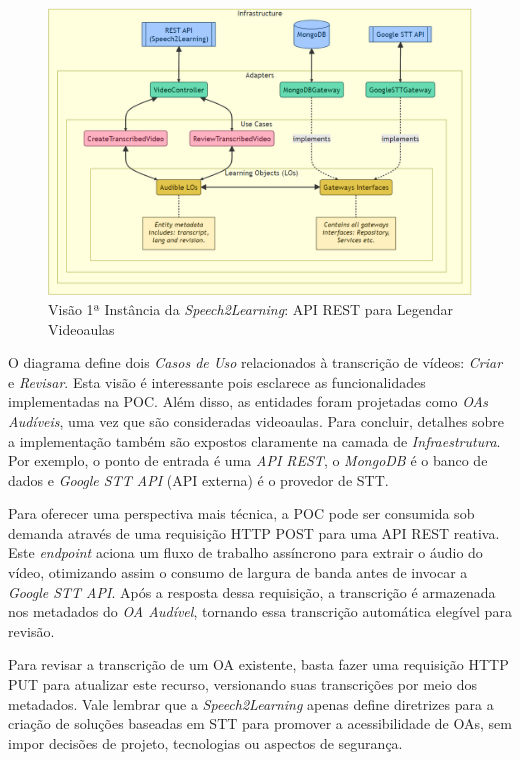 \begin{figure}[htb]
\centering
\caption{Visão 1ª Instância da \textit{Speech2Learning}: API REST para Legendar Videoaulas}
\label{fig:chapter4-cs1-poc-diagram}
\includegraphics[width=\columnwidth]{images/chapter4-cs1-poc-diagram.png}
\end{figure}

O diagrama define dois \textit{Casos de Uso} relacionados à transcrição de vídeos: \textit{Criar} e \textit{Revisar}. Esta visão é interessante pois esclarece as funcionalidades implementadas na POC. Além disso, as entidades foram projetadas como \textit{OAs Audíveis}, uma vez que são consideradas videoaulas. Para concluir, detalhes sobre a implementação também são expostos claramente na camada de \textit{Infraestrutura}. Por exemplo, o ponto de entrada é uma \textit{API REST}, o \textit{MongoDB} é o banco de dados e \textit{Google STT API} (API externa) é o provedor de STT.

Para oferecer uma perspectiva mais técnica, a POC pode ser consumida sob demanda através de uma requisição HTTP POST para uma API REST reativa. Este \textit{endpoint} aciona um fluxo de trabalho assíncrono para extrair o áudio do vídeo, otimizando assim o consumo de largura de banda antes de invocar a \textit{Google STT API}. Após a resposta dessa requisição, a transcrição é armazenada nos metadados do \textit{OA Audível}, tornando essa transcrição automática elegível para revisão.

Para revisar a transcrição de um OA existente, basta fazer uma requisição HTTP PUT para atualizar este recurso, versionando suas transcrições por meio dos metadados. Vale lembrar que a \textit{Speech2Learning} apenas define diretrizes para a criação de soluções baseadas em STT para promover a acessibilidade de OAs, sem impor decisões de projeto, tecnologias ou aspectos de segurança.


